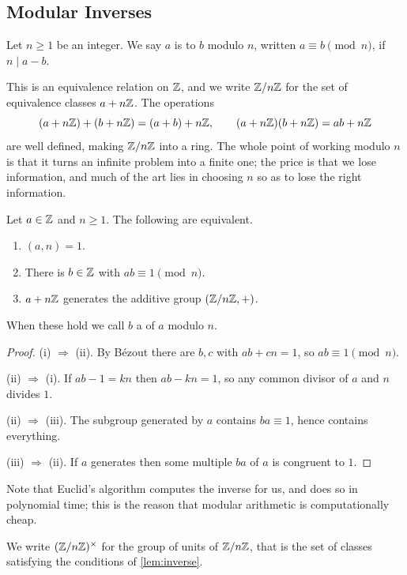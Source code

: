 \documentclass[a4paper]{scrartcl}
\begin{document}
\subsection{Modular Inverses}

\begin{definition}
	Let $n \geq 1$ be an integer. We say $a$ is  to $b$ modulo $n$, written $a \equiv b \pmod n$, if $n \mid a - b$.
\end{definition}

This is an equivalence relation on $\mathbb{Z}$, and we write $\mathbb{Z}/n\mathbb{Z}$ for the set of equivalence classes $a + n\mathbb{Z}$. The operations
$$
(a + n\mathbb{Z}) + (b + n\mathbb{Z}) = (a + b) + n\mathbb{Z}, \qquad (a + n\mathbb{Z})(b + n\mathbb{Z}) = ab + n\mathbb{Z}
$$
are well defined, making $\mathbb{Z}/n\mathbb{Z}$ into a ring. The whole point of working modulo $n$ is that it turns an infinite problem into a finite one; the price is that we lose information, and much of the art lies in choosing $n$ so as to lose the right information.

\begin{lemma}\label{lem:inverse}
	Let $a \in \mathbb{Z}$ and $n \geq 1$. The following are equivalent.
	\begin{enumerate}[label=(\roman*)]
		\item $(a, n) = 1$.
		\item There is $b \in \mathbb{Z}$ with $ab \equiv 1 \pmod n$.
		\item $a + n\mathbb{Z}$ generates the additive group $(\mathbb{Z}/n\mathbb{Z}, +)$.
	\end{enumerate}
	When these hold we call $b$ a  of $a$ modulo $n$.
\end{lemma}
\begin{proof}
	(i) $\Rightarrow$ (ii). By Bézout there are $b, c$ with $ab + cn = 1$, so $ab \equiv 1 \pmod n$.

	(ii) $\Rightarrow$ (i). If $ab - 1 = kn$ then $ab - kn = 1$, so any common divisor of $a$ and $n$ divides $1$.

	(ii) $\Rightarrow$ (iii). The subgroup generated by $a$ contains $ba \equiv 1$, hence contains everything.

	(iii) $\Rightarrow$ (ii). If $a$ generates then some multiple $ba$ of $a$ is congruent to $1$.
\end{proof}

Note that Euclid's algorithm computes the inverse for us, and does so in polynomial time; this is the reason that modular arithmetic is computationally cheap.

\begin{definition}
	We write $(\mathbb{Z}/n\mathbb{Z})^\times$ for the group of units of $\mathbb{Z}/n\mathbb{Z}$, that is the set of classes satisfying the conditions of \autoref{lem:inverse}.
\end{definition}
\end{document}
